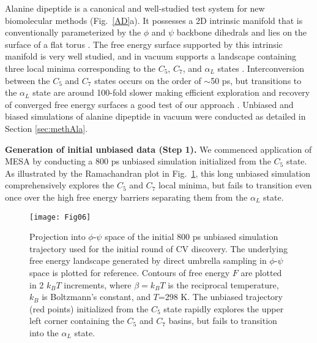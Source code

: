 \documentclass[12pt]{article}
\newcommand*{\blauw}[1]{#1}
\begin{document}
Alanine dipeptide is a canonical and well-studied test system for new biomolecular methods \cite{hashemian2015topological,ferguson2011integrating,preto2014fast,zheng2013rapid,chodera2007use,hummer2003coarse,chodera2006long,chodera2007automatic} (\blauw{Fig.~\ref{AD}a}). It possesses a 2D intrinsic manifold that is conventionally parameterized by the $\phi$ and $\psi$ backbone dihedrals and lies on the surface of a flat torus \cite{hashemian2015topological,bolhuis2000reaction,preto2014fast,jakli2012variation}. The free energy surface supported by this intrinsic manifold is very well studied, and in vacuum supports a landscape containing three local minima corresponding to the $C_5$, $C_7$, and $\alpha_L$ states \cite{bolhuis2000reaction,preto2014fast}. Interconversion between the $C_5$ and $C_7$ states occurs on the order of $\sim$50 ps, but transitions to the $\alpha_L$ state are around 100-fold slower making efficient exploration and recovery of converged free energy surfaces a good test of our approach \cite{preto2014fast}. Unbiased and biased simulations of alanine dipeptide in vacuum were conducted as detailed in \blauw{Section \ref{sec:methAla}}.



\textbf{Generation of initial unbiased data (Step 1).} We commenced application of MESA by conducting a 800 ps unbiased simulation initialized from the $C_5$ state. As illustrated by the Ramachandran plot in \blauw{Fig.~\ref{unbiased}}, this long unbiased simulation comprehensively explores the $C_5$ and $C_7$ local minima, but fails to transition even once over the high free energy barriers separating them from the $\alpha_L$ state.

\begin{figure}[ht!]
\begin{center}
\texttt{[image: Fig06]} 
\caption{Projection into $\phi$-$\psi$ space of the initial 800 ps unbiased simulation trajectory used for the initial round of CV discovery. The underlying free energy landscape generated by direct umbrella sampling in $\phi$-$\psi$ space is plotted for reference. Contours of free energy $F$ are plotted in 2 $k_B T$ increments, where $\beta = k_B T$ is the reciprocal temperature, $k_B$ is Boltzmann's constant, and $T$=298 K. The unbiased trajectory (red points) initialized from the $C_5$ state rapidly explores the upper left corner containing the $C_5$ and $C_7$ basins, but fails to transition into the $\alpha_L$ state.}
\label{unbiased}
\end{center}
\end{figure}
\end{document}
